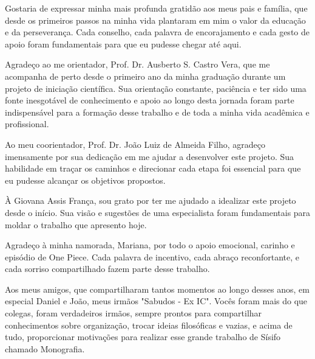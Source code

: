 
\begin{agradecimentos}
Gostaria de expressar minha mais profunda gratidão aos meus pais e família, que desde os primeiros passos na minha vida plantaram em mim o valor da educação e da perseverança. Cada conselho, cada palavra de encorajamento e cada gesto de apoio foram fundamentais para que eu pudesse chegar até aqui.

Agradeço ao me orientador,  Prof. Dr. Ausberto S. Castro Vera, que me acompanha de perto desde o primeiro ano da minha graduação durante um projeto de iniciação científica. Sua orientação constante, paciência e ter sido uma fonte inesgotável de conhecimento e apoio ao longo desta jornada foram parte indispensável para a formação desse trabalho e de toda a minha vida acadêmica e profissional.  

Ao meu coorientador, Prof. Dr. João Luiz de Almeida Filho, agradeço imensamente por sua dedicação em me ajudar a desenvolver este projeto. Sua habilidade em traçar os caminhos e direcionar cada etapa foi essencial para que eu pudesse alcançar os objetivos propostos.

À Giovana Assis França, sou grato por ter me ajudado a idealizar este projeto desde o início. Sua visão e sugestões de uma especialista foram fundamentais para moldar o trabalho que apresento hoje.

Agradeço à minha namorada, Mariana, por todo o apoio emocional, carinho e episódio de One Piece. Cada palavra de incentivo, cada abraço reconfortante, e cada sorriso compartilhado fazem parte desse trabalho. 

Aos meus amigos, que compartilharam tantos momentos ao longo desses anos, em especial Daniel e João, meus irmãos "Sabudos - Ex IC". Vocês foram mais do que colegas, foram verdadeiros irmãos, sempre prontos para compartilhar conhecimentos sobre organização, trocar ideias filosóficas e vazias, e acima de tudo, proporcionar motivações para realizar esse grande trabalho de Sísifo chamado Monografia.


\end{agradecimentos}
